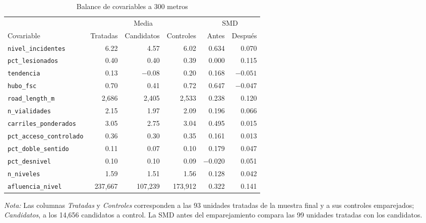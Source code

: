 \begin{table}[htbp]
    \centering
    \caption{Balance de covariables a 300 metros}
    \label{tab:balance}
    \footnotesize
    \setlength{\tabcolsep}{4pt}
    \begin{tabular}{l r r r r r}
        \toprule
        & \multicolumn{3}{c}{Media} & \multicolumn{2}{c}{SMD} \\
        \cmidrule(lr){2-4} \cmidrule(lr){5-6}
        Covariable & Tratadas & Candidatos & Controles & Antes & Después \\
        \midrule
        \texttt{nivel\_incidentes} & 6.22 & 4.57 & 6.02 & 0.634 & 0.070 \\
        \texttt{pct\_lesionados} & 0.40 & 0.40 & 0.39 & 0.000 & 0.115 \\
        \texttt{tendencia} & 0.13 & $-0.08$ & 0.20 & 0.168 & $-0.051$ \\
        \texttt{hubo\_fsc} & 0.70 & 0.41 & 0.72 & 0.647 & $-0.047$ \\
        \texttt{road\_length\_m} & 2,686 & 2,405 & 2,533 & 0.238 & 0.120 \\
        \texttt{n\_vialidades} & 2.15 & 1.97 & 2.09 & 0.196 & 0.066 \\
        \texttt{carriles\_ponderados} & 3.05 & 2.75 & 3.04 & 0.495 & 0.015 \\
        \texttt{pct\_acceso\_controlado} & 0.36 & 0.30 & 0.35 & 0.161 & 0.013 \\
        \texttt{pct\_doble\_sentido} & 0.11 & 0.07 & 0.10 & 0.179 & 0.047 \\
        \texttt{pct\_desnivel} & 0.10 & 0.10 & 0.09 & $-0.020$ & 0.051 \\
        \texttt{n\_niveles} & 1.59 & 1.51 & 1.56 & 0.128 & 0.042 \\
        \texttt{afluencia\_nivel} & 237,667 & 107,239 & 173,912 & 0.322 & 0.141 \\
        \bottomrule
    \end{tabular}
    \begin{minipage}{0.95\linewidth}\linespread{1}\selectfont
        \vspace{0.4em}
        \footnotesize \textit{Nota:} Las columnas \emph{Tratadas} y \emph{Controles} corresponden a las 93 unidades tratadas de la muestra final y a sus controles emparejados; \emph{Candidatos}, a los 14,656 candidatos a control. La SMD antes del emparejamiento compara las 99 unidades tratadas con los candidatos.
    \end{minipage}
\end{table}

